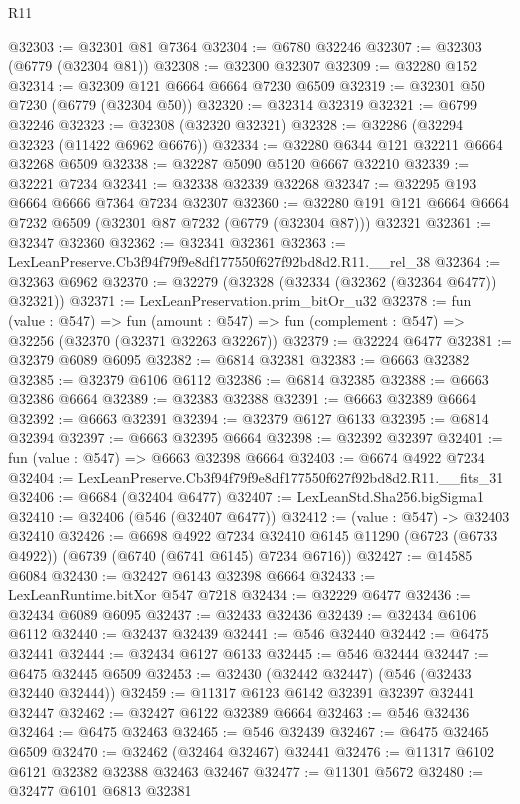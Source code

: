 \begin{lexlean}{R11}
\begin{coremodule}
@32303 := @32301 @81 @7364
@32304 := @6780 @32246
@32307 := @32303 (@6779 (@32304 @81))
@32308 := @32300 @32307
@32309 := @32280 @152
@32314 := @32309 @121 @6664 @6664 @7230 @6509
@32319 := @32301 @50 @7230 (@6779 (@32304 @50))
@32320 := @32314 @32319
@32321 := @6799 @32246
@32323 := @32308 (@32320 @32321)
@32328 := @32286 (@32294 @32323 (@11422 @6962 @6676))
@32334 := @32280 @6344 @121 @32211 @6664 @32268 @6509
@32338 := @32287 @5090 @5120 @6667 @32210
@32339 := @32221 @7234
@32341 := @32338 @32339 @32268
@32347 := @32295 @193 @6664 @6666 @7364 @7234 @32307
@32360 := @32280 @191 @121 @6664 @6664 @7232 @6509 (@32301 @87 @7232 (@6779 (@32304 @87))) @32321
@32361 := @32347 @32360
@32362 := @32341 @32361
@32363 := LexLeanPreserve.Cb3f94f79f9e8df177550f627f92bd8d2.R11.__rel_38
@32364 := @32363 @6962
@32370 := @32279 (@32328 (@32334 (@32362 (@32364 @6477)) @32321))
@32371 := LexLeanPreservation.prim_bitOr_u32
@32378 := fun (value : @547) =>
  fun (amount : @547) => fun (complement : @547) => @32256 (@32370 (@32371 @32263 @32267))
@32379 := @32224 @6477
@32381 := @32379 @6089 @6095
@32382 := @6814 @32381
@32383 := @6663 @32382
@32385 := @32379 @6106 @6112
@32386 := @6814 @32385
@32388 := @6663 @32386 @6664
@32389 := @32383 @32388
@32391 := @6663 @32389 @6664
@32392 := @6663 @32391
@32394 := @32379 @6127 @6133
@32395 := @6814 @32394
@32397 := @6663 @32395 @6664
@32398 := @32392 @32397
@32401 := fun (value : @547) => @6663 @32398 @6664
@32403 := @6674 @4922 @7234
@32404 := LexLeanPreserve.Cb3f94f79f9e8df177550f627f92bd8d2.R11.__fits_31
@32406 := @6684 (@32404 @6477)
@32407 := LexLeanStd.Sha256.bigSigma1
@32410 := @32406 (@546 (@32407 @6477))
@32412 := (value : @547) -> @32403 @32410
@32426 := @6698
    @4922
    @7234
    @32410
    @6145
    @11290
    (@6723 (@6733 @4922))
    (@6739 (@6740 (@6741 @6145) @7234 @6716))
@32427 := @14585 @6084
@32430 := @32427 @6143 @32398 @6664
@32433 := LexLeanRuntime.bitXor @547 @7218
@32434 := @32229 @6477
@32436 := @32434 @6089 @6095
@32437 := @32433 @32436
@32439 := @32434 @6106 @6112
@32440 := @32437 @32439
@32441 := @546 @32440
@32442 := @6475 @32441
@32444 := @32434 @6127 @6133
@32445 := @546 @32444
@32447 := @6475 @32445 @6509
@32453 := @32430 (@32442 @32447) (@546 (@32433 @32440 @32444))
@32459 := @11317 @6123 @6142 @32391 @32397 @32441 @32447
@32462 := @32427 @6122 @32389 @6664
@32463 := @546 @32436
@32464 := @6475 @32463
@32465 := @546 @32439
@32467 := @6475 @32465 @6509
@32470 := @32462 (@32464 @32467) @32441
@32476 := @11317 @6102 @6121 @32382 @32388 @32463 @32467
@32477 := @11301 @5672
@32480 := @32477 @6101 @6813 @32381

\end{coremodule}
\end{lexlean}
